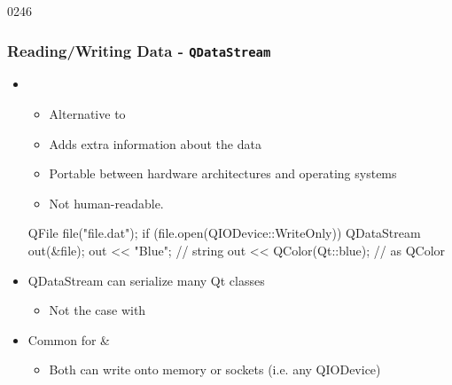 \begin{slide}[fragile]{0246}\frametitle{Reading/Writing Data - \texttt{QDataStream}}
\begin{itemize}  
  \item {}  
  \begin{itemize}
    \item Alternative to       
    \item Adds extra information about the data
    \item Portable between hardware architectures and operating systems
    \item Not human-readable.
  \end{itemize}
  \begin{cpp}
QFile file("file.dat");
if (file.open(QIODevice::WriteOnly)) {
  QDataStream out(&file);
  out << "Blue"; // string
  out << QColor(Qt::blue); // as QColor
}
  \end{cpp}  
  \item QDataStream can serialize many Qt classes
    \begin{itemize}    
    \item Not the case with 
    \end{itemize}    
  \item Common for  \& 
    \begin{itemize}
    	\item Both can write onto memory or sockets (i.e. any QIODevice)
    \end{itemize}
  \end{itemize}         
\end{slide}


